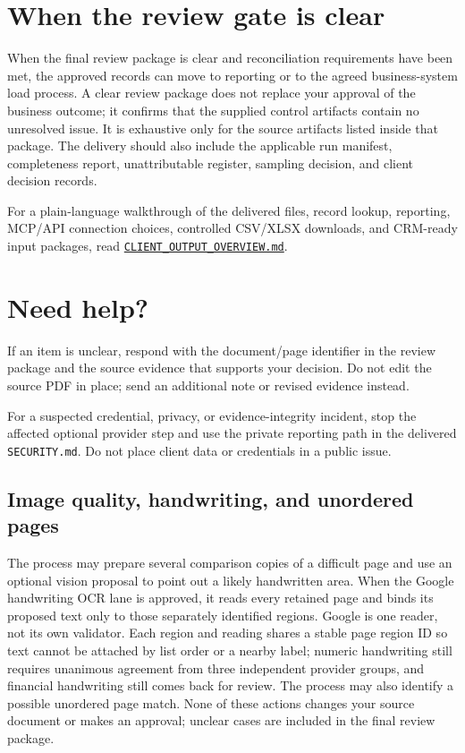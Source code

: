 \documentclass[
]{article}
\begin{document}
\section{When the review gate is
clear}\label{when-the-review-gate-is-clear}

When the final review package is clear and reconciliation requirements
have been met, the approved records can move to reporting or to the
agreed business-system load process. A clear review package does not
replace your approval of the business outcome; it confirms that the
supplied control artifacts contain no unresolved issue. It is exhaustive
only for the source artifacts listed inside that package. The delivery
should also include the applicable run manifest, completeness report,
unattributable register, sampling decision, and client decision records.

For a plain-language walkthrough of the delivered files, record lookup,
reporting, MCP/API connection choices, controlled CSV/XLSX downloads,
and CRM-ready input packages, read
\href{CLIENT_OUTPUT_OVERVIEW.md}{\texttt{CLIENT\_\allowbreak{}OUTPUT\_\allowbreak{}OVERVIEW.md}}.

\section{Need help?}\label{need-help}

If an item is unclear, respond with the document/page identifier in the
review package and the source evidence that supports your decision. Do
not edit the source PDF in place; send an additional note or revised
evidence instead.

For a suspected credential, privacy, or evidence-integrity incident,
stop the affected optional provider step and use the private reporting
path in the delivered \texttt{SECURITY.md}. Do not place client data or
credentials in a public issue.

\subsection{Image quality, handwriting, and unordered
pages}\label{image-quality-handwriting-and-unordered-pages}

The process may prepare several comparison copies of a difficult page
and use an optional vision proposal to point out a likely handwritten
area. When the Google handwriting OCR lane is approved, it reads every
retained page and binds its proposed text only to those separately
identified regions. Google is one reader, not its own validator. Each
region and reading shares a stable page region ID so text cannot be
attached by list order or a nearby label; numeric handwriting still
requires unanimous agreement from three independent provider groups, and
financial handwriting still comes back for review. The process may also
identify a possible unordered page match. None of these actions changes
your source document or makes an approval; unclear cases are included in
the final review package.
\end{document}
